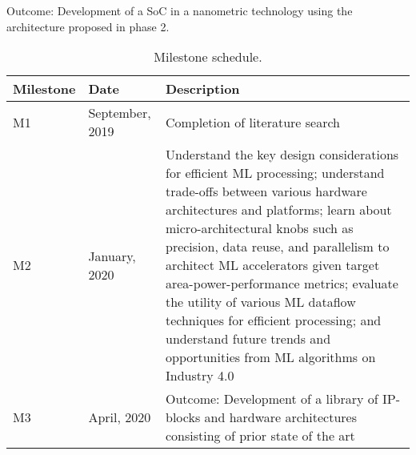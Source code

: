 Outcome: Development of a SoC in a nanometric technology using the architecture proposed in phase 2.


\begin{table}[p]
	\caption{Milestone schedule.}\label{tab:mileston_schedule}
	\begin{tabular}{|l|l|m{8.5cm}|}
		\hline
		\rowcolor[HTML]{C0C0C0} 
		\textbf{Milestone} & \textbf{Date}   & \textbf{Description}                                                                                                                                                                                                                                                                                                                                                                                                                                                                \\ \hline
		M1                 & September, 2019 & Completion of literature search                                                                                                                                                                                                                                                                                                                                                                                                                                                     \\ \hline
		M2                 & January, 2020   & Understand the key design considerations for efficient ML processing; understand trade-offs between various hardware architectures and platforms; learn about micro-architectural knobs such as precision, data reuse, and parallelism to architect ML accelerators given target area-power-performance metrics; evaluate the utility of various ML dataflow techniques for efficient processing; and understand future trends and opportunities from ML algorithms on Industry 4.0 \\ \hline
		M3                 & April, 2020     & Outcome: Development of a library of IP-blocks and hardware architectures consisting of prior state of the art                                                                                                                                                                                                                                                                                                                                                                      \\ \hline

\end{tabular}
\end{table}

